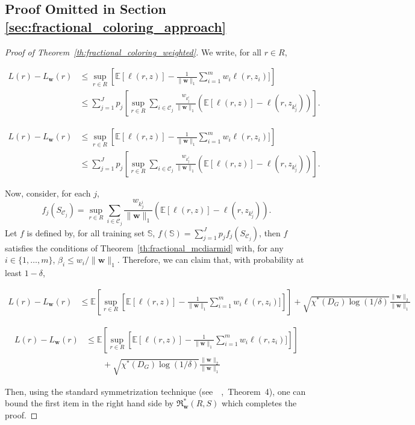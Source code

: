 \documentclass[letterpaper]{article} %
\def\DoubleColumn{}
\def\DoubleColumnEnd{}
\def\SingleColumn{}
\def\SingleColumnEnd{}
\newcommand{\E}{\mathbb{E}}
\newcommand{\weight}{\mathbf{w}}
\newcommand{\empiricalrisk}[1]{L_{#1}}
\newcommand{\risk}{L}
\newcommand{\normo}[1]{\|#1\|_1}
\newcommand{\fcoloring}{\chi^*}
\newcommand{\set}[1]{\{#1\}}
\newcommand{\trainingset}{\mathbb{S}}
\newcommand{\citep}[3]{(#1\ \citeauthor{#3}\ \citeyear{#3},\ #2)}
\begin{document}
\subsection{Proof Omitted in Section \ref{sec:fractional_coloring_approach}} %
\label{sub:proofs_omitted_in_section_a}
\begin{proof}[Proof of Theorem~\ref{th:fractional_coloring_weighted}]
We write, for all $r\in R$,
\SingleColumn
\begin{equation}
  \label{eq:fractional_coloring_decomposition}
    \begin{aligned}
    \risk{}(r)-\empiricalrisk{\weight{}}(r)&\le \sup_{r\in R}\left[\E[\ell(r,z)] - \frac{1}{\normo{\weight{}}}\sum_{i=1}^m w_i\ell(r,z_i)]\right]\\
    &\le \sum_{j=1}^J p_j\left[ \sup_{r\in R}\sum_{i\in\mathcal{C}_j} \frac{w_{k_j^i}}{\normo{\weight{}}} (\E[\ell(r,z)] - \ell(r,z_{k_j^i}))\right].
    \end{aligned}
\end{equation}
\SingleColumnEnd
\DoubleColumn
\begin{equation}
  \label{eq:fractional_coloring_decomposition}
    \begin{aligned}
    \risk{}(r)-\empiricalrisk{\weight{}}(r)&\le \sup_{r\in R}\left[\E[\ell(r,z)] - \frac{1}{\normo{\weight{}}}\sum_{i=1}^m w_i\ell(r,z_i)]\right]\\
    &\le \sum_{j=1}^J p_j\left[ \sup_{r\in R}\sum_{i\in\mathcal{C}_j} \frac{w_{k_j^i}}{\normo{\weight{}}} (\E[\ell(r,z)] - \ell(r,z_{k_j^i}))\right].
    \end{aligned}
\end{equation}
\DoubleColumnEnd
Now, consider, for each $j$,
\[f_j(S_{\mathcal{C}_j}) = \sup_{r\in R}\sum_{i\in\mathcal{C}_j} \frac{w_{k_j^i}}{\normo{\weight{}}} (\E[\ell(r,z)] - \ell(r,z_{k_j^i})).\]
Let $f$ is defined by, for all training set $\trainingset{}$, $f(\trainingset{})=\sum_{j=1}^Jp_jf_j(S_{\mathcal{C}_j})$, then $f$ satisfies the conditions of Theorem~\ref{th:fractional_mcdiarmid} with, for any $i\in \set{1,\dots,m}$, $\beta_i\le w_i/\normo{\weight{}}$. Therefore, we can claim that, with probability at least $1-\delta$,
\SingleColumn
\begin{align*}
  \risk{}(r) - \empiricalrisk{\weight{}}(r)&\le \E\left[\sup_{r\in R}\left[\E[\ell(r,z)] - \frac{1}{\normo{\weight{}}}\sum_{i=1}^m w_i\ell(r,z_i)]\right]\right] + \sqrt{\fcoloring(D_G)\log(1/\delta)}\frac{\|\weight{}\|_2}{\normo{\weight{}}}
\end{align*}
\SingleColumnEnd
\DoubleColumn
\begin{align*}
  \risk{}(r) - \empiricalrisk{\weight{}}(r)&\le \E\left[\sup_{r\in R}\left[\E[\ell(r,z)] - \frac{1}{\normo{\weight{}}}\sum_{i=1}^m w_i\ell(r,z_i)]\right]\right]\\
  &\qquad+ \sqrt{\fcoloring(D_G)\log(1/\delta)}\frac{\|\weight{}\|_2}{\normo{\weight{}}}
\end{align*}
\DoubleColumnEnd
Then, using the standard symmetrization technique \citep{see}{Theorem~4}{Usunier2005}, one can bound the first item in the right hand side by $\mathfrak{R}_{\weight{}}^*(R,S)$ which completes the proof. 
\end{proof}
\end{document}
